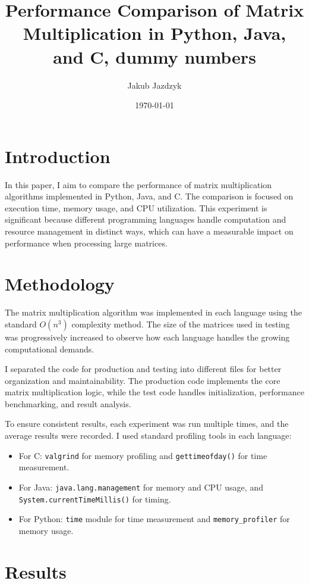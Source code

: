 \documentclass{article}
\title{Performance Comparison of Matrix Multiplication in Python, Java, and C, dummy numbers}
\author{Jakub Jazdzyk}
\date{\today}
\begin{document}
\maketitle

\section{Introduction}

In this paper, I aim to compare the performance of matrix multiplication algorithms implemented in Python, Java, and C. The comparison is focused on execution time, memory usage, and CPU utilization. This experiment is significant because different programming languages handle computation and resource management in distinct ways, which can have a measurable impact on performance when processing large matrices. 

\section{Methodology}

The matrix multiplication algorithm was implemented in each language using the standard \(O(n^3)\) complexity method. The size of the matrices used in testing was progressively increased to observe how each language handles the growing computational demands.

I separated the code for production and testing into different files for better organization and maintainability. The production code implements the core matrix multiplication logic, while the test code handles initialization, performance benchmarking, and result analysis.

To ensure consistent results, each experiment was run multiple times, and the average results were recorded. I used standard profiling tools in each language: 

\begin{itemize}
    \item For C: \texttt{valgrind} for memory profiling and \texttt{gettimeofday()} for time measurement.
    \item For Java: \texttt{java.lang.management} for memory and CPU usage, and \texttt{System.currentTimeMillis()} for timing.
    \item For Python: \texttt{time} module for time measurement and \texttt{memory\_profiler} for memory usage.
\end{itemize}

\section{Results}
\end{document}
